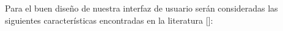 



Para el buen diseño de nuestra interfaz de usuario serán consideradas las siguientes características encontradas en la literatura [\cite{35,36,37}]:

